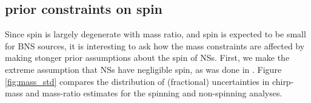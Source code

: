 \subsection{prior constraints on spin}
\label{subsec:prior_constraints}

Since spin is largely degenerate with mass ratio, and spin is expected to be small for BNS sources, it is interesting to ask how the mass constraints are affected by making stonger prior assumptions about the spin of NSs.  First, we make the extreme assumption that NSs have negligible spin, as was done in \citet{Singer_2014}.  Figure \ref{fig:mass_std} compares the distribution of (fractional) uncertainties in chirp-mass and mass-ratio estimates for the spinning and non-spinning analyses.
